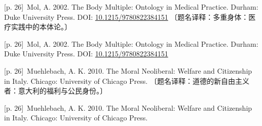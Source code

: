 \documentclass[10pt,a4paper]{article}
\begin{document}
\noindent\begin{minipage}{\textwidth}\begin{minipage}[t]{\dimexpr.5\textwidth-4mm\relax}\noindent\begin{minipage}[t]{\linewidth}{\scriptsize\color{gray} [p. 26]}\ Mol, A. 2002. The Body Multiple: Ontology in Medical Practice. Durham: Duke University Press. DOI: \url{10.1215/9780822384151} 〔题名译释：多重身体：医疗实践中的本体论。〕\par\end{minipage}\par\end{minipage}\hfill\begin{minipage}[t]{\dimexpr.5\textwidth-4mm\relax}\noindent\begin{minipage}[t]{\linewidth}{\scriptsize\color{gray} [p. 26]}\ Mol, A. 2002. The Body Multiple: Ontology in Medical Practice. Durham: Duke University Press. DOI: \url{10.1215/9780822384151}\par\end{minipage}\par\end{minipage}\end{minipage}\par
\noindent\begin{minipage}{\textwidth}\begin{minipage}[t]{\dimexpr.5\textwidth-4mm\relax}\noindent\begin{minipage}[t]{\linewidth}{\scriptsize\color{gray} [p. 26]}\ Muehlebach, A. K. 2010. The Moral Neoliberal: Welfare and Citizenship in Italy. Chicago: University of Chicago Press. 〔题名译释：道德的新自由主义者：意大利的福利与公民身份。〕\par\end{minipage}\par\end{minipage}\hfill\begin{minipage}[t]{\dimexpr.5\textwidth-4mm\relax}\noindent\begin{minipage}[t]{\linewidth}{\scriptsize\color{gray} [p. 26]}\ Muehlebach, A. K. 2010. The Moral Neoliberal: Welfare and Citizenship in Italy. Chicago: University of Chicago Press.\par\end{minipage}\par\end{minipage}\end{minipage}\par
\end{document}
